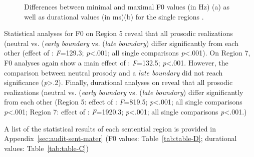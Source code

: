 \documentclass[fleqn,reqno,10pt,draft]{article}
\begin{document}
\begin{figure}[ht]
	\centering
	\caption[]{Differences between minimal and maximal F0 values (in Hz) (a) as well
	as durational values (in ms)(b) for 
	the single regions  .}
	\label{fig:acoustics_fi}
\end{figure}


Statistical analyses for F0 on Region 5 reveal that all prosodic realizations
(neutral vs. (\emph{early boundary} vs. (\emph{late boundary}) differ significantly
from each other (effect of : \emph{F}=129.3; \emph{p}<.001; all
single comparisons \emph{p}<.001). On Region 7, F0 analyses again show a main
effect of : \emph{F}=132.5; \emph{p}<.001. However, the comparison
between neutral prosody and a \emph{late boundary} did not reach significance 
(\emph{p}>.2). Finally, durational analyses on reveal that all prosodic realizations
(neutral vs. (\emph{early boundary} vs. (\emph{late boundary}) differ significantly
from each other (Region 5: effect of : \emph{F}=819.5; \emph{p}<.001; all
single comparisons \emph{p}<.001; Region 7: effect of : \emph{F}=1920.3; 
\emph{p}<.001; all single comparisons \emph{p}<.001.)

A list of the statistical results of each sentential region is provided in 
Appendix~\ref{sec:audit-sent-mater} (F0 values: Table~\ref{tab:table-D};
durational values: Table~\ref{tab:table-C})

\end{document}
